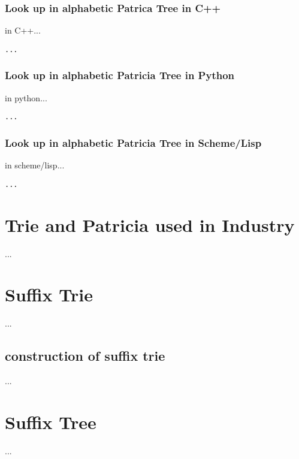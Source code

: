 \documentclass{article}
\begin{document}
\subsubsection*{Look up in alphabetic Patrica Tree in C++}
in C++...

\lstset{language=C++}
\begin{lstlisting}
...
\end{lstlisting}


\subsubsection*{Look up in alphabetic Patricia Tree in Python}
in python...

\lstset{language=Python}
\begin{lstlisting}
...
\end{lstlisting}

\subsubsection*{Look up in alphabetic Patricia Tree in Scheme/Lisp}
in scheme/lisp...

\lstset{language=lisp}
\begin{lstlisting}
...
\end{lstlisting}

\section{Trie and Patricia used in Industry}
...

\section{Suffix Trie}
...

\subsection{construction of suffix trie}
...

\section{Suffix Tree}
...
\end{document}
